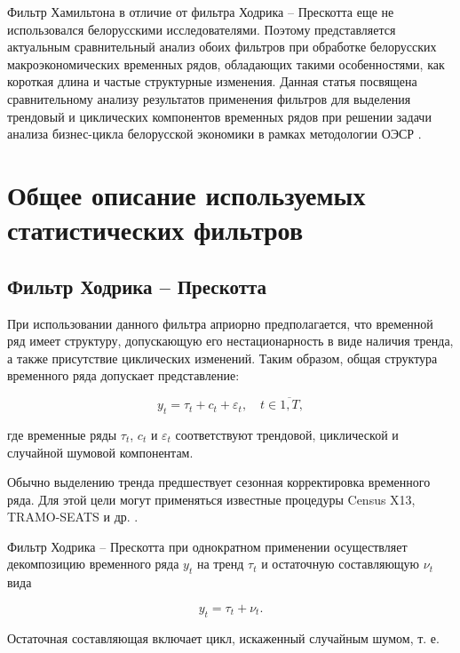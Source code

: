 \documentclass[a4paper,14pt]{extreport}
\begin{document}
	Фильтр Хамильтона в отличие от фильтра Ходрика – Прескотта еще не использовался белорусскими исследователями. Поэтому представляется актуальным сравнительный анализ обоих фильтров при обработке белорусских макроэкономических временных рядов, обладающих такими особенностями, как короткая длина и частые структурные изменения. Данная статья посвящена сравнительному анализу результатов применения фильтров для выделения трендовый и циклических компонентов временных рядов при решении задачи анализа бизнес-цикла белорусской экономики в рамках методологии ОЭСР \cite{oecdCycleExtraction, esiMaking}. 
	
	\section{Общее описание используемых статистических фильтров}
	
	\subsection{Фильтр Ходрика – Прескотта}
	
	При использовании данного фильтра априорно предполагается, что временной ряд   имеет структуру, допускающую его нестационарность в виде наличия тренда, а также присутствие циклических изменений. Таким образом, общая структура временного ряда допускает представление:
	
	\begin{equation}
	\label{eq:decomposition}
	y_t = \tau_t + c_t + \varepsilon_t, \quad t \in \overline{1,T},
	\end{equation}
	
	где временные ряды  $\tau_t$, $c_t$ и $\varepsilon_t$ соответствуют трендовой, циклической и случайной шумовой компонентам. 
	
	Обычно выделению тренда предшествует сезонная корректировка временного ряда. Для этой цели могут применяться известные процедуры Census X13, TRAMO-SEATS и др. \cite{oecdCycleExtraction, esiMakingAlt}. 
	
	Фильтр Ходрика – Прескотта при однократном применении осуществляет декомпозицию временного ряда $y_t$ на тренд $\tau_t$ и остаточную составляющую $\nu_t$ вида
	
	\begin{equation}
	\label{eq:decomp1}
	y_t = \tau_t + \nu_t .
	\end{equation}
	
	Остаточная составляющая включает цикл, искаженный случайным шумом, т. е. 
	
\end{document}
